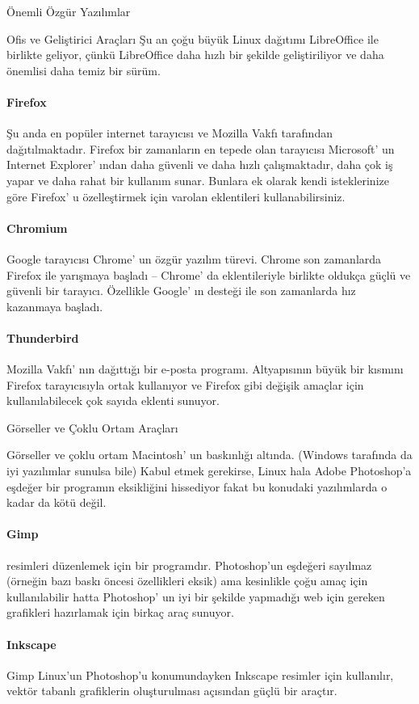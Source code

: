 \documentclass[10pt,a5paper]{book}
\begin{document}
\begin{section}{Önemli Özgür Yazılımlar}
\begin{subsection}{Ofis ve Geliştirici Araçları}
Şu an çoğu büyük Linux dağıtımı LibreOffice ile birlikte geliyor, çünkü LibreOffice daha hızlı bir şekilde geliştiriliyor ve daha önemlisi daha temiz bir sürüm.
\paragraph{Firefox}{Şu anda en popüler internet tarayıcısı ve Mozilla Vakfı tarafından dağıtılmaktadır. Firefox bir zamanların en tepede olan tarayıcısı Microsoft' un Internet Explorer' ından daha güvenli ve daha hızlı çalışmaktadır, daha çok iş yapar ve daha rahat bir kullanım sunar. Bunlara ek olarak kendi isteklerinize göre Firefox' u özelleştirmek için varolan eklentileri kullanabilirsiniz.}
\paragraph{Chromium}{Google tarayıcısı Chrome' un özgür yazılım türevi. Chrome son zamanlarda Firefox ile yarışmaya başladı – Chrome' da eklentileriyle birlikte oldukça güçlü ve güvenli bir tarayıcı. Özellikle Google' ın desteği ile son zamanlarda hız kazanmaya başladı.}
\paragraph{Thunderbird}{Mozilla Vakfı' nın dağıttığı bir e-posta programı. Altyapısının büyük bir kısmını Firefox tarayıcısıyla ortak kullanıyor ve Firefox gibi değişik amaçlar için kullanılabilecek çok sayıda eklenti sunuyor.}
\end{subsection}
\begin{subsection}{Görseller ve Çoklu Ortam Araçları}

Görseller ve çoklu ortam Macintosh' un baskınlığı altında. (Windows tarafında da iyi yazılımlar sunulsa bile) Kabul etmek gerekirse, Linux hala Adobe Photoshop'a eşdeğer bir programın eksikliğini hissediyor fakat bu konudaki yazılımlarda o kadar da kötü değil.

\paragraph{Gimp}{resimleri düzenlemek için bir programdır. Photoshop'un eşdeğeri sayılmaz (örneğin bazı baskı öncesi özellikleri eksik) ama kesinlikle çoğu amaç için kullanılabilir hatta Photoshop' un iyi bir şekilde yapmadığı web için gereken grafikleri hazırlamak için birkaç araç sunuyor.}
\paragraph{Inkscape}{Gimp Linux'un Photoshop'u konumundayken Inkscape resimler için kullanılır, vektör tabanlı grafiklerin oluşturulması açısından güçlü bir araçtır.}

\end{subsection}
\end{section}
\end{document}
